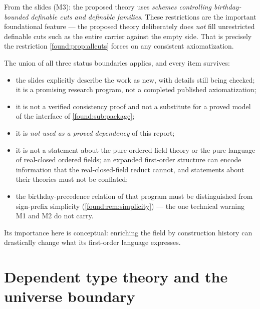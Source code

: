 \documentclass[11pt,letterpaper]{article}
\numberwithin{equation}{section}
\theoremstyle{definition}
\theoremstyle{remark}
\begin{document}
From the slides (M3): the proposed theory uses \emph{schemes controlling
birthday-bounded definable cuts and definable families}. These restrictions are
the important foundational feature --- the proposed theory deliberately does
\emph{not} fill unrestricted definable cuts such as the entire carrier against
the empty side. That is precisely the restriction \cref{found:prop:allcuts}
forces on any consistent axiomatization.

The union of all three status boundaries applies, and every item survives:
\begin{itemize}
\item the slides explicitly describe the work as new, with details still being
checked; it is a promising research program, not a completed published
axiomatization;
\item it is not a verified consistency proof and not a substitute for a proved
model of the interface of \cref{found:sub:package};
\item it is \emph{not used as a proved dependency} of this report;
\item it is not a statement about the pure ordered-field theory or the pure
language of real-closed ordered fields; an expanded first-order structure can
encode information that the real-closed-field reduct cannot, and statements
about their theories must not be conflated;
\item the birthday-precedence relation of that program must be distinguished
from sign-prefix simplicity (\cref{found:rem:simplicity}) --- the one technical
warning M1 and M2 do not carry.
\end{itemize}
Its importance here is conceptual: enriching the field by construction history
can drastically change what its first-order language expresses.
\section{Dependent type theory and the universe boundary}
\label{found:sec:types}
\end{document}

